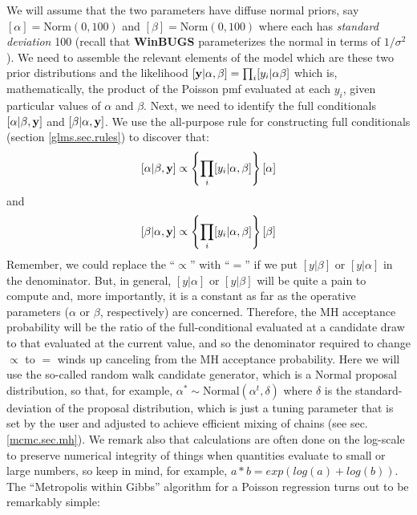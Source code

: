 We will assume that the two parameters have diffuse
normal priors, say $[\alpha] = \mbox{Norm}(0,100)$ and
$[\beta]=\mbox{Norm}(0,100)$ where each has {\it standard deviation}
100 (recall that {\bf WinBUGS} parameterizes the normal in terms of $1/\sigma^{2}$).
We need to assemble the relevant elements of the model which are these
two prior distributions and the
likelihood $[{\bf y}|\alpha,\beta] = \prod_{i} [y_i|\alpha \beta] $ which is,
mathematically, the product of the Poisson pmf evaluated at each $y_i$,
given particular values of $\alpha$ and $\beta$.
Next, we need to identify the full conditionals
$[\alpha|\beta, {\bf y}]$ and $[\beta|\alpha,{\bf y}]$.  We use the all-purpose
rule for constructing full conditionals
(section \ref{glms.sec.rules})
 to discover that:
\[
 [\alpha|\beta,{\bf y}] \propto \left\{ \prod_{i} [y_{i}|\alpha,\beta]\right\}[\alpha]
\]
and
\[
 [\beta|\alpha,{\bf y}] \propto \left\{ \prod_{i}
   [y_{i}|\alpha,\beta]\right\} [\beta]
\]
Remember, we could replace the ``$\propto$'' with ``$=$'' if we
put $[y|\beta]$ or $[y|\alpha]$ in the denominator. But, in general,
$[y|\alpha]$ or $[y|\beta]$ will be quite a pain to compute and, more
importantly, it is a constant as far as the operative parameters
($\alpha$ or $\beta$,
respectively) are concerned. Therefore,
the MH acceptance probability will be the ratio of the
full-conditional evaluated at a candidate draw to that evaluated at the
current value, and so the denominator required to change $\propto$ to $=$
winds up canceling from the MH acceptance probability.
Here we will
use the so-called random walk candidate generator, which is a Normal proposal distribution, so that, for example,
 $\alpha^{*} \sim \mbox{Normal}(\alpha^{t},\delta)$ where $\delta$ is
 the standard-deviation of the proposal distribution, which is just a
 tuning parameter that is set by the user and adjusted to achieve
 efficient mixing of chains (see sec. \ref{mcmc.sec.mh}).
We remark also that calculations are often done on the log-scale to
preserve numerical integrity of things when quantities evaluate to
small or large numbers, so keep in mind, for example,
$a*b = exp(log(a) + log(b))$.
 The ``Metropolis within
Gibbs'' algorithm for a Poisson regression turns out to be  remarkably simple:
